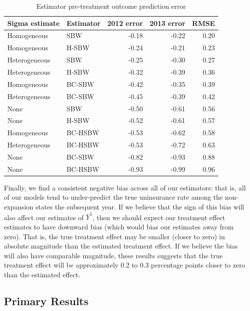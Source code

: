 \documentclass[article]{imsart}
\theoremstyle{plain}
\theoremstyle{remark}
\begin{document}
\begin{table}[ht]
\caption{Estimator pre-treatment outcome prediction error}
\label{tab:pretxpred}
\begin{tabular}{llrrr}
  \hline
Sigma estimate & Estimator & 2012 error & 2013 error & RMSE \\ 
  \hline
Homogeneous & SBW & -0.18 & -0.22 & 0.20 \\ 
  Homogeneous & H-SBW & -0.24 & -0.21 & 0.23 \\ 
  Heterogeneous & SBW & -0.25 & -0.30 & 0.27 \\ 
  Heterogeneous & H-SBW & -0.32 & -0.39 & 0.36 \\ 
  Homogeneous & BC-SBW & -0.42 & -0.35 & 0.39 \\ 
  Heterogeneous & BC-SBW & -0.45 & -0.39 & 0.42 \\ 
  None & SBW & -0.50 & -0.61 & 0.56 \\ 
  None & H-SBW & -0.52 & -0.61 & 0.57 \\ 
  Homogeneous & BC-HSBW & -0.53 & -0.62 & 0.58 \\ 
  Heterogeneous & BC-HSBW & -0.53 & -0.72 & 0.63 \\ 
  None & BC-SBW & -0.82 & -0.93 & 0.88 \\ 
  None & BC-HSBW & -0.93 & -0.99 & 0.96 \\ 
   \hline
\end{tabular}
\end{table}

Finally, we find a consistent negative bias across all of our estimators: that is, all of our models tend to under-predict the true uninsurance rate among the non-expansion states the subsequent year. If we believe that the sign of this bias will also affect our estimates of $\bar{Y}^1$, then we should expect our treatment effect estimates to have downward bias (which would bias our estimates away from zero). That is, the true treatment effect may be smaller (closer to zero) in absolute magnitude than the estimated treatment effect. If we believe the bias will also have comparable magnitude, these results suggests that the true treatment effect will be approximately 0.2 to 0.3 percentage points closer to zero than the estimated effect.

\subsection{Primary Results}
\end{document}
